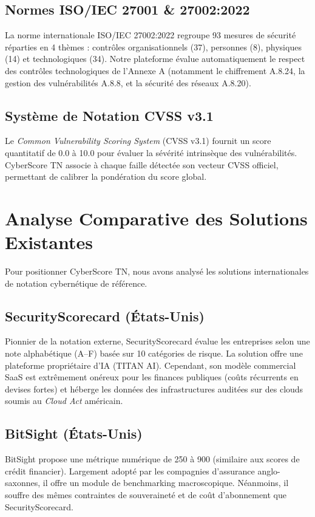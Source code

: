 \subsection{Normes ISO/IEC 27001 \& 27002:2022}
La norme internationale ISO/IEC 27002:2022 \cite{iso27002} regroupe 93 mesures de sécurité réparties en 4 thèmes : contrôles organisationnels (37), personnes (8), physiques (14) et technologiques (34). Notre plateforme évalue automatiquement le respect des contrôles technologiques de l'Annexe A (notamment le chiffrement A.8.24, la gestion des vulnérabilités A.8.8, et la sécurité des réseaux A.8.20).

\subsection{Système de Notation CVSS v3.1}
Le \textit{Common Vulnerability Scoring System} (CVSS v3.1) \cite{firstcvss} fournit un score quantitatif de 0.0 à 10.0 pour évaluer la sévérité intrinsèque des vulnérabilités. CyberScore TN associe à chaque faille détectée son vecteur CVSS officiel, permettant de calibrer la pondération du score global.

\section{Analyse Comparative des Solutions Existantes}
Pour positionner CyberScore TN, nous avons analysé les solutions internationales de notation cybernétique de référence.

\subsection{SecurityScorecard (États-Unis)}
Pionnier de la notation externe, SecurityScorecard évalue les entreprises selon une note alphabétique (A--F) basée sur 10 catégories de risque. La solution offre une plateforme propriétaire d'IA (TITAN AI). Cependant, son modèle commercial SaaS est extrêmement onéreux pour les finances publiques (coûts récurrents en devises fortes) et héberge les données des infrastructures auditées sur des clouds soumis au \textit{Cloud Act} américain.

\subsection{BitSight (États-Unis)}
BitSight propose une métrique numérique de 250 à 900 (similaire aux scores de crédit financier). Largement adopté par les compagnies d'assurance anglo-saxonnes, il offre un module de benchmarking macroscopique. Néanmoins, il souffre des mêmes contraintes de souveraineté et de coût d'abonnement que SecurityScorecard.

